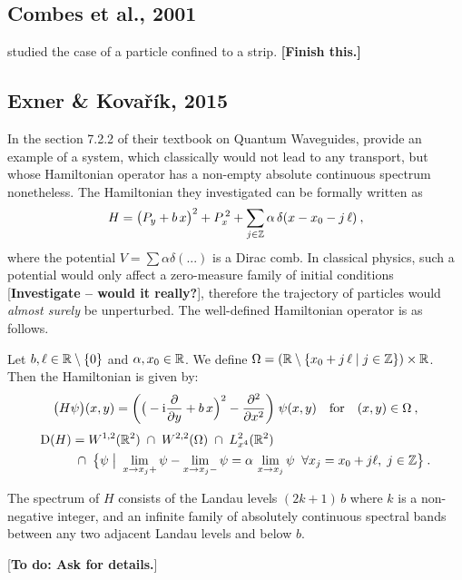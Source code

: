 \subsection{Combes et al., 2001}
\cite{Combes2001} studied the case of a particle confined to a strip.
\textbf{[Finish this.]}

\subsection{Exner \& Kovařík, 2015}
In the section 7.2.2 of their textbook on Quantum Waveguides, \cite{ExnerKovarik2015} provide an example of a system, which classically would not lead to any transport, but whose Hamiltonian operator has a non-empty absolute continuous spectrum nonetheless. The Hamiltonian they investigated can be formally written as \begin{equation*}
    H
    = \big(P_y + b \, x \big)^2
    + P_x^{\,2}
    + \sum_{j\in\mathbb{Z}} \alpha \, \delta(x - x_0 - j \, \ell)
    \: ,
\end{equation*}
where the potential $V = \sum\alpha\delta(...)$ is a Dirac comb. In classical physics, such a potential would only affect a zero-measure family of initial conditions [\textbf{Investigate – would it really?}], therefore the trajectory of particles would \textit{almost surely} be unperturbed. The well-defined Hamiltonian operator is as follows.
\begin{defn}
    Let $b, \ell \in \mathbb{R} \setminus \{0\}$ and $\alpha, x_0 \in \mathbb{R}$. We define $\Omega = (\mathbb{R} \setminus \{ x_0 + j \, \ell \;|\; j \in \mathbb{Z} \}) \times \mathbb{R}$. Then the Hamiltonian is given by:
    \begin{equation*}
        \big( H\psi \big)(x, y)
        = \bigg(
            \big(-\mathrm{i}\frac{\partial }{\partial y} + b \, x \Big)^2 - \frac{\partial ^2}{\partial x^2}
        \bigg) \; \psi(x, y)
        \quad
        \text{for}
        \quad
        (x, y) \in \Omega
        \: ,
    \end{equation*}
    \begin{align*}
        \mathrm{D}(H)
        &= W^{1,2}(\mathbb{R}^2)
        \;\cap\; W^{2,2}(\Omega)
        \;\cap\; L^2_{x^4}(\mathbb{R}^2) \\
        &\;\cap\;
        \big\{
            \psi
            \;\big|\
            \lim_{x \to x_j+} \psi - \lim_{x \to x_j-} \psi
            = \alpha \, \lim_{x \to x_j} \psi
            \;\; \forall x_j = x_0 + j \ell, \; j \in \mathbb{Z}
        \big\}
        \:.
    \end{align*}
\end{defn}
\begin{thm}
    The spectrum of $H$ consists of the Landau levels $(2k + 1) \, b$ where $k$ is a non-negative integer, and an infinite family of absolutely continuous spectral bands between any two adjacent Landau levels and below $b$.
\end{thm}
[\textbf{To do: Ask for details.}]

